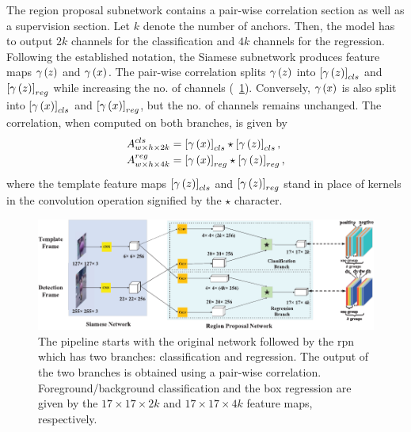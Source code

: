 The region proposal subnetwork contains a pair-wise correlation section as well as a supervision section. Let $k$ denote the number of anchors. Then, the model has to output $2k$ channels for the classification and $4k$ channels for the regression. Following the established notation, the Siamese subnetwork produces feature maps ${\gamma} \left( z \right)$ and ${\gamma} \left( x \right)$. The pair-wise correlation splits ${\gamma} \left( z \right)$ into $\left[ {{\gamma} \left( z \right)} \right]_{cls}$ and $\left[ {{\gamma} \left( z \right)} \right]_{reg}$ while increasing the no. of channels (\figstr{}~\ref{fig:SiamRPNNetArchitecture}). Conversely, ${\gamma} \left( x \right)$ is also split into $\left[ {{\gamma} \left( x \right)} \right]_{cls}$ and $\left[ {{\gamma} \left( x \right)} \right]_{reg}$, but the no. of channels remains unchanged. The correlation, when computed on both branches, is given by
\begin{equation}
    \begin{aligned}
        {A}_{w \times h \times 2k}^{cls} & =
        \left[ {{\gamma} \left( x \right)} \right]_{cls} \star \left[ {{\gamma} \left( z \right)} \right]_{cls}, \\
        {A}_{w \times h \times 4k}^{reg} & =
        \left[ {{\gamma} \left( x \right)} \right]_{reg} \star \left[ {{\gamma} \left( z \right)} \right]_{reg},
    \end{aligned}
\end{equation}
where the template feature maps $\left[ {{\gamma} \left( z \right)} \right]_{cls}$ and $\left[ {{\gamma} \left( z \right)} \right]_{reg}$ stand in place of kernels in the convolution operation signified by the $\star$ character.

\begin{figure}[t]
    \centerline{\includegraphics[width=\linewidth]{figures/theoretical_foundations/siam_rpn_architecture.pdf}}
    \caption[ architecture]{The pipeline starts with the original  network followed by the \gls{rpn} which has two branches: classification and regression. The output of the two branches is obtained using a pair-wise correlation. Foreground/background classification and the box regression are given by the $17 \times 17 \times 2k$ and $17 \times 17 \times 4k$ feature maps, respectively. }
    \label{fig:SiamRPNNetArchitecture}
\end{figure}

